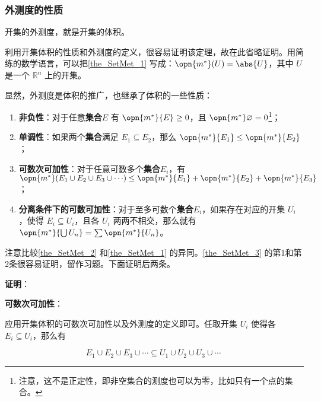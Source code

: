 \subsubsection{外测度的性质}

\begin{theorem}{}\label{the_SetMet_1}
开集的外测度，就是开集的体积。
\end{theorem}

利用开集体积的性质和外测度的定义，很容易证明该定理，故在此省略证明。用简练的数学语言，可以把\autoref{the_SetMet_1} 写成：$\opn{m^*}(U)=\abs{U}$，其中 $U$ 是一个 $\mathbb{R}^n$ 上的开集。

显然，外测度是体积的推广，也继承了体积的一些性质：

\begin{theorem}{}\label{the_SetMet_3}
\begin{enumerate}
\item \textbf{非负性}：对于任意\textbf{集合}$E$ 有 $\opn{m^*}{E}\geq 0$，且 $\opn{m^*}\varnothing=0$\footnote{注意，这不是正定性，即非空集合的测度也可以为零，比如只有一个点的集合。}；\\
\item \textbf{单调性}：如果两个\textbf{集合}满足 $E_1\subseteq E_2$，那么 $\opn{m^*}{E_1}\leq \opn{m^*}{E_2}$；\\
\item \textbf{可数次可加性}：对于任意可数多个\textbf{集合}$E_i$，有 $\opn{m^*}({E_1\cup E_2\cup E_3\cup \cdots})\leq \opn{m^*}{E_1}+\opn{m^*}{E_2}+\opn{m^*}{E_3}$；\\
\item \textbf{分离条件下的可数可加性}：对于至多可数个\textbf{集合}$E_i$，如果存在对应的开集 $U_i$，使得 $E_i\subseteq U_i$，且各 $U_i$ 两两不相交，那么就有 $\opn{m^*}{\bigcup U_n}=\sum\opn{m^*}{U_n}$。
\end{enumerate}
\end{theorem}

注意比较\autoref{the_SetMet_2} 和\autoref{the_SetMet_1} 的异同。\autoref{the_SetMet_3} 的第1和第2条很容易证明，留作习题。下面证明后两条。

\textbf{证明}：

\textbf{可数次可加性}：

应用开集体积的可数次可加性以及外测度的定义即可。任取开集 $U_i$ 使得各 $E_i\subseteq U_i$，那么有

\begin{equation}
E_1\cup E_2\cup E_3\cup \cdots \subseteq U_1\cup U_2\cup U_3\cup \cdots~
\end{equation}

